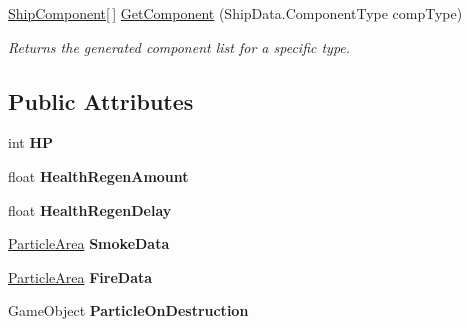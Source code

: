 \begin{DoxyCompactItemize}
\item 
\hyperlink{class_skyrates_1_1_ship_1_1_ship_component}{Ship\-Component}\mbox{[}$\,$\mbox{]} \hyperlink{class_skyrates_1_1_ship_1_1_ship_hull_a8bfc377871bb1b2faab4024883339c26}{Get\-Component} (Ship\-Data.\-Component\-Type comp\-Type)
\begin{DoxyCompactList}\small\item\em Returns the generated component list for a specific type. \end{DoxyCompactList}\end{DoxyCompactItemize}
\subsection*{Public Attributes}
\begin{DoxyCompactItemize}
\item 
\hypertarget{class_skyrates_1_1_ship_1_1_ship_hull_afc1806de6452f9d4df07bc0620cf50b9}{int {\bfseries H\-P}}\label{class_skyrates_1_1_ship_1_1_ship_hull_afc1806de6452f9d4df07bc0620cf50b9}

\item 
\hypertarget{class_skyrates_1_1_ship_1_1_ship_hull_af6a0066197ff9d43b51f0e460fa04ac1}{float {\bfseries Health\-Regen\-Amount}}\label{class_skyrates_1_1_ship_1_1_ship_hull_af6a0066197ff9d43b51f0e460fa04ac1}

\item 
\hypertarget{class_skyrates_1_1_ship_1_1_ship_hull_acc3a96792b34871f8b64d4db683943fb}{float {\bfseries Health\-Regen\-Delay}}\label{class_skyrates_1_1_ship_1_1_ship_hull_acc3a96792b34871f8b64d4db683943fb}

\item 
\hypertarget{class_skyrates_1_1_ship_1_1_ship_hull_af800157392ebd1bafc84097918373943}{\hyperlink{class_skyrates_1_1_ship_1_1_ship_hull_1_1_particle_area}{Particle\-Area} {\bfseries Smoke\-Data}}\label{class_skyrates_1_1_ship_1_1_ship_hull_af800157392ebd1bafc84097918373943}

\item 
\hypertarget{class_skyrates_1_1_ship_1_1_ship_hull_a0e916e647b5d822f00908fdee72ce36c}{\hyperlink{class_skyrates_1_1_ship_1_1_ship_hull_1_1_particle_area}{Particle\-Area} {\bfseries Fire\-Data}}\label{class_skyrates_1_1_ship_1_1_ship_hull_a0e916e647b5d822f00908fdee72ce36c}

\item 
\hypertarget{class_skyrates_1_1_ship_1_1_ship_hull_a590e30e386abc7e32aefe6a86baba57f}{Game\-Object {\bfseries Particle\-On\-Destruction}}\label{class_skyrates_1_1_ship_1_1_ship_hull_a590e30e386abc7e32aefe6a86baba57f}


\end{DoxyCompactItemize}
